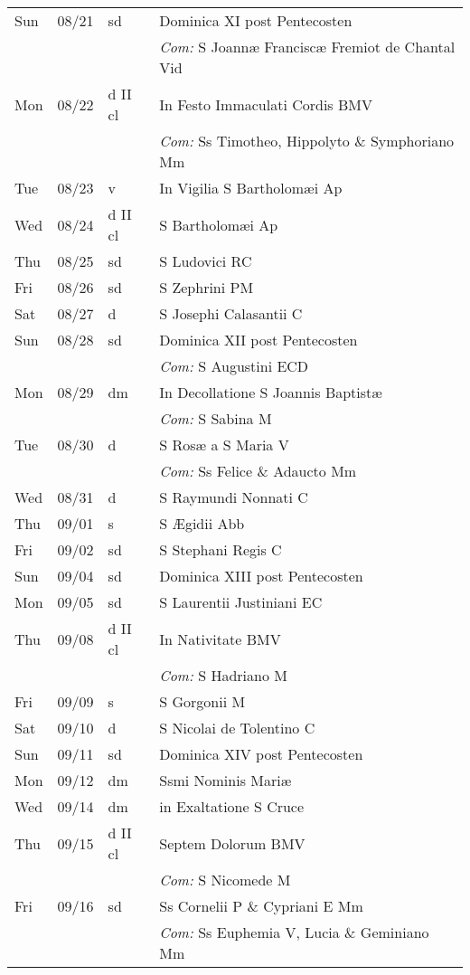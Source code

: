 \documentclass[10pt]{article}
\begin{document}
\begin{longtable}{ l l l l }
Sun & 08/21 & sd & Dominica XI post Pentecosten\\
 & & & \textit{Com:} S Joannæ Franciscæ Fremiot de Chantal Vid\\
Mon & 08/22 & d II cl & In Festo Immaculati Cordis BMV\\
 & & & \textit{Com:} Ss Timotheo, Hippolyto \& Symphoriano Mm\\
Tue & 08/23 & v & In Vigilia S Bartholomæi Ap\\
Wed & 08/24 & d II cl & S Bartholomæi Ap\\
Thu & 08/25 & sd & S Ludovici RC\\
Fri & 08/26 & sd & S Zephrini PM\\
Sat & 08/27 & d & S Josephi Calasantii C\\
Sun & 08/28 & sd & Dominica XII post Pentecosten\\
 & & & \textit{Com:} S Augustini ECD\\
Mon & 08/29 & dm & In Decollatione S Joannis Baptistæ\\
 & & & \textit{Com:} S Sabina M\\
Tue & 08/30 & d & S Rosæ a S Maria V\\
 & & & \textit{Com:} Ss Felice \& Adaucto Mm\\
Wed & 08/31 & d & S Raymundi Nonnati C\\
Thu & 09/01 & s & S Ægidii Abb\\
Fri & 09/02 & sd & S Stephani Regis C\\
Sun & 09/04 & sd & Dominica XIII post Pentecosten\\
Mon & 09/05 & sd & S Laurentii Justiniani EC\\
Thu & 09/08 & d II cl & In Nativitate BMV\\
 & & & \textit{Com:} S Hadriano M\\
Fri & 09/09 & s & S Gorgonii M\\
Sat & 09/10 & d & S Nicolai de Tolentino C\\
Sun & 09/11 & sd & Dominica XIV post Pentecosten\\
Mon & 09/12 & dm & Ssmi Nominis Mariæ\\
Wed & 09/14 & dm & in Exaltatione S Cruce\\
Thu & 09/15 & d II cl & Septem Dolorum BMV\\
 & & & \textit{Com:} S Nicomede M\\
Fri & 09/16 & sd & Ss Cornelii P \& Cypriani E Mm\\
 & & & \textit{Com:} Ss Euphemia V, Lucia \& Geminiano Mm\\

\end{longtable}
\end{document}
